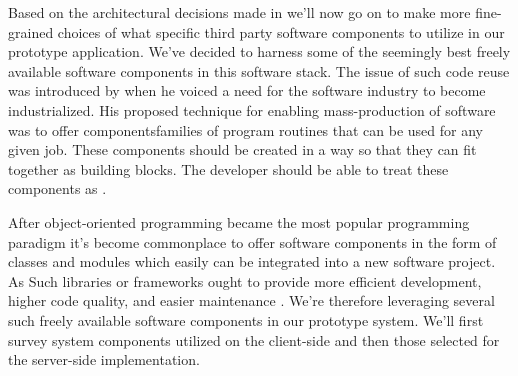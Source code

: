 Based on the architectural decisions made in 
 we'll now go on to make more fine-grained choices
of what specific third party software components to utilize in our prototype
application. We've decided to harness some of the seemingly best freely
available software components in this software stack. The issue of such code
reuse was introduced by \citet[]{mcilroy68} when he voiced a need
for the software industry to become industrialized. His proposed technique for
enabling mass-production of software was to offer components\dash{}families
of program routines that can be used for any given job. These components
should be created in a way so that they can fit together as building blocks.
The developer should be able to treat these components as %
.

After object-oriented programming became the most popular
programming paradigm%
it's become commonplace to offer software components in the form of classes
and modules which easily can be integrated into a new software project.
As 
Such libraries or frameworks ought to provide more efficient development,
higher code quality, and easier maintenance \citep[]{stroustrup96}.
We're therefore leveraging several such freely available software components
in our prototype system. We'll first survey system components utilized
on the client-side and then those selected for the server-side implementation.


